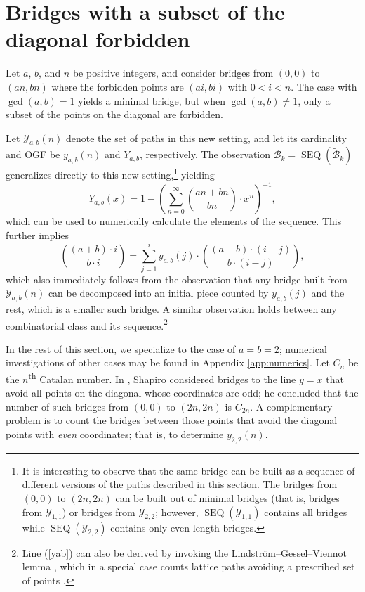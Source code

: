 \documentclass[10pt]{article}
\newcommand{\neqn}[1]{\begin{equation} #1 \end{equation}}
\newcommand{\seq}[0]{\operatorname{SEQ}}
\begin{document}
\section{Bridges with a subset of the diagonal forbidden} \label{shapirosection}

Let $a$, $b$, and $n$ be positive integers, and consider bridges from $(0,0)$ to $(an,bn)$ where the forbidden points are $(ai,bi)$ with $0<i<n$.  The case with $\gcd(a,b)=1$ yields a minimal bridge, but when $\gcd(a,b)\neq1$, only a subset of the points on the diagonal are forbidden.

Let $\mathcal{Y}_{a,b}(n)$ denote the set of paths in this new setting, and let its cardinality and OGF be $y_{a,b}(n)$ and $Y_{a,b}$, respectively.  The observation $\mathcal{B}_k = \seq(\widetilde{\mathcal{B}}_k)$ generalizes directly to this new setting,\footnote{It is interesting to observe that the same bridge can be built as a sequence of different versions of the paths described in this section. The bridges from $(0,0)$ to $(2n,2n)$ can be built out of minimal bridges (that is, bridges from $\mathcal{Y}_{1,1}$) or bridges from $\mathcal{Y}_{2,2}$; however, $\seq(\mathcal{Y}_{1,1})$ contains all bridges while $\seq(\mathcal{Y}_{2,2})$ contains only even-length bridges.} yielding
\neqn{Y_{a,b}(x) = 1 - \left( \sum_{n=0}^\infty \binom{an+bn}{bn} \cdot x^n \right)^{-1}, \label{Yab}}
which can be used to numerically calculate the elements of the sequence. This further implies
\neqn{\binom{(a+b)\cdot i}{b\cdot i}=\sum_{j=1}^i y_{a,b}(j)\cdot\binom{(a+b)\cdot(i-j)}{b\cdot(i-j)}, \label{yab}}
which also immediately follows from the observation that any bridge built from $\mathcal{Y}_{a,b}(n)$ can be decomposed into an initial piece counted by $y_{a,b}(j)$ and the rest, which is a smaller such bridge. A similar observation holds between any combinatorial class and its sequence.\footnote{Line (\ref{yab}) can also be derived by invoking the Lindstr\"{o}m--Gessel--Viennot lemma \cite{dpapp,lindstrom}, which in a special case counts lattice paths avoiding a prescribed set of points \cite[Lemma 10.7.2]{encylatt} \cite[Ex.\ 2.7.2]{stanley2012}.}

In the rest of this section, we specialize to the case of $a=b=2$; numerical investigations of other cases may be found in Appendix \ref{app:numerics}.
Let $C_n$ be the $n$\textsuperscript{th} Catalan number.  In \cite{shapiro1992}, Shapiro considered bridges to the line $y=x$ that avoid all points on the diagonal whose coordinates are odd; he concluded \cite[Example 2.5]{shapiro1992} that the number of such bridges from $(0,0)$ to $(2n,2n)$ is $C_{2n}$.  A complementary problem is to count the bridges between those points that avoid the diagonal points with \emph{even} coordinates; that is, to determine $y_{2,2}(n)$.  
\end{document}
